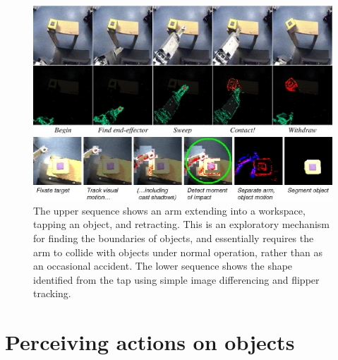 \begin{figure}[tb]
\begin{center}
\includegraphics[width=\columnwidth]{poking-sequence.eps}

\includegraphics[width=\columnwidth]{fig-poke-zoom.eps}
\caption{ 
\label{fig:poking-sequence}
%
  The upper sequence shows an arm extending into a workspace, tapping
  an object, and retracting.  This is an exploratory mechanism for
  finding the boundaries of objects, and essentially requires the arm
  to collide with objects under normal operation, rather than as an
  occasional accident.  The lower sequence shows the shape
  identified from the tap using simple image differencing and flipper
  tracking.
%
}
\end{center}
\end{figure}



\section{Perceiving actions on objects}

